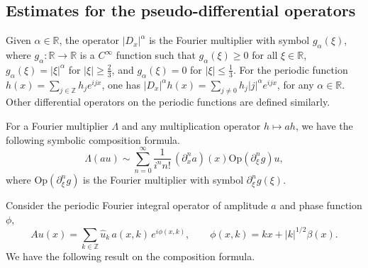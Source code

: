 \documentclass[12pt]{amsart}
\theoremstyle{remark}
\theoremstyle{definition}
\numberwithin{equation}{section}
\newcommand{\p}{\partial}
\newcommand{\R}{\mathbb{R}}
\newcommand{\Z}{\mathbb{Z}}
\newcommand{\al}{\alpha}
\newcommand{\f}{\frac}
\renewcommand{\b}{\beta}
\begin{document}
\subsection{Estimates for the pseudo-differential operators}

Given $\al \in \R$, the operator $|D_x|^\al$ is the Fourier multiplier with symbol $g_\al(\xi)$, where $g_\al:\R \rightarrow \R$ is a $C^\infty$ function such that $g_\al(\xi) \geq 0$ for all $\xi \in \R$, $g_\al(\xi) = |\xi|^\al$ for $|\xi| \geq \f23$, and $g_\al(\xi) = 0$ for $|\xi| \leq \f13$.
For the periodic function $h(x) = \sum_{j\in \Z}h_j e^{ijx}$, one has $|D_x|^\al h(x) = \sum_{j\neq 0}h_j |j|^\al e^{ijx}$, for any $\al \in \R$.
Other differential operators on the periodic functions are defined similarly.

For a Fourier multiplier $\Lambda$ and any multiplication operator $h \mapsto a h$, we have the following symbolic composition formula.
\begin{equation}  \label{SymbolExpansion}
\Lambda (a u) \sim \sum_{n=0}^\infty \frac{1}{i^n n!} \, (\p_x^n a)(x)   \mathrm{Op}(\p^n_\xi g) u,
\end{equation}
where Op$(\p^n_\xi g)$ is the Fourier multiplier with symbol $\p^n_\xi g(\xi)$. 

Consider the periodic Fourier integral operator of amplitude $a$ and phase function $\phi$, 
\begin{equation} \label{def A FIO with amplitude}
Au(x) = \sum_{k \in \Z} \hat u_k \, a(x,k) \, e^{i \phi(x,k)}, \qquad 
\phi(x,k) = kx + |k|^{1/2} \b(x).
\end{equation}
We have the following result on the composition formula.
\end{document}
